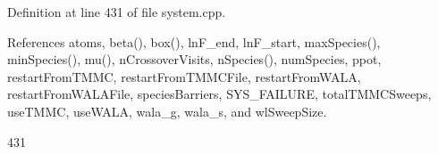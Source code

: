 Definition at line 431 of file system.\-cpp.



References atoms, beta(), box(), ln\-F\-\_\-end, ln\-F\-\_\-start, max\-Species(), min\-Species(), mu(), n\-Crossover\-Visits, n\-Species(), num\-Species, ppot, restart\-From\-T\-M\-M\-C, restart\-From\-T\-M\-M\-C\-File, restart\-From\-W\-A\-L\-A, restart\-From\-W\-A\-L\-A\-File, species\-Barriers, S\-Y\-S\-\_\-\-F\-A\-I\-L\-U\-R\-E, total\-T\-M\-M\-C\-Sweeps, use\-T\-M\-M\-C, use\-W\-A\-L\-A, wala\-\_\-g, wala\-\_\-s, and wl\-Sweep\-Size.


\begin{DoxyCode}
431                                                                                                            
                                                                                                                  

\end{DoxyCode}
